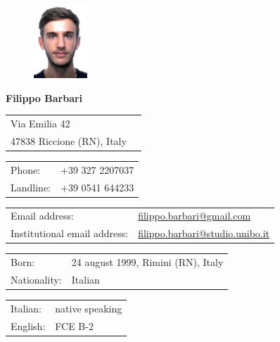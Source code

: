 \documentclass[curriculum-vitae-eng]{subfiles}
\begin{document}
	\begin{figure}
		\includegraphics[width=0.18\textwidth]{fototessera}
	\end{figure}
	
	{\LARGE\bfseries Filippo Barbari} %
	\bigskip
	
	\begin{tabular}{ll}
		Via Emilia 42 & \\
		47838 Riccione (RN), Italy & \\
	\end{tabular}
	\medskip
	
	\begin{tabular}{ll}
		Phone: & +39 327 2207037\\
		Landline: & +39 0541 644233
	\end{tabular}
	\medskip
	
	\begin{tabular}{ll}
		Email address: & \href{mailto:filippo.barbari@gmail.com}{filippo.barbari@gmail.com}\\
		Institutional email address: & \href{mailto:filippo.barbari@studio.unibo.it}{filippo.barbari@studio.unibo.it}
	\end{tabular}
	\medskip
	
	\begin{tabular}{ll}
		Born: & 24 august 1999, Rimini (RN), Italy\\ %
		Nationality: & Italian %
	\end{tabular}
	\medskip
	
	\begin{tabular}{ll}
		Italian: & native speaking\\
		English: & FCE B-2
	\end{tabular}
\end{document}
